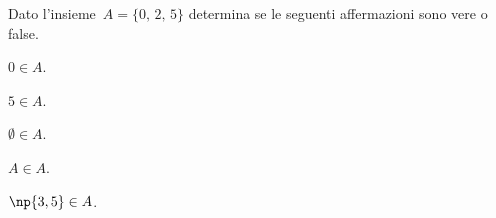 \begin{esercizio}
\label{ese:5.15}
Dato l'insieme~$A = \{\text{0, 2, 5}\}$ determina se le seguenti affermazioni sono vere o false.
\TabPositions{2.5cm}
\begin{enumeratea}
\item $0\in A$. \tab\boxV\quad\boxF
\item $5\in A$. \tab\boxV\quad\boxF
\item $\emptyset \in A$. \tab\boxV\quad\boxF
\item $A\in A$. \tab\boxV\quad\boxF
\item $\np{3,5}\in A$. \tab\boxV\quad\boxF
\end{enumeratea}
\end{esercizio}
